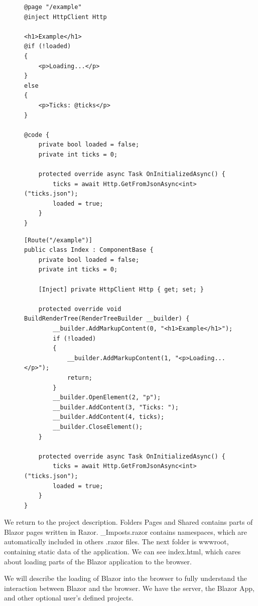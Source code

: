 \begin{figure}
\begin{minipage}[c]{0.95\textwidth}
\begin{lstlisting}[basicstyle=\small, caption=Example of Razor page., label={lst:razorpage}]
@page "/example"
@inject HttpClient Http

<h1>Example</h1>
@if (!loaded)
{
    <p>Loading...</p>
}
else
{
    <p>Ticks: @ticks</p>
}

@code {
    private bool loaded = false;
    private int ticks = 0;

    protected override async Task OnInitializedAsync() {
        ticks = await Http.GetFromJsonAsync<int>("ticks.json");
        loaded = true;
    }
}
\end{lstlisting}
\end{minipage}
\begin{minipage}[c]{0.95\textwidth}
\begin{lstlisting}[basicstyle=\small, caption=Razor page generated to the C\# class., label={lst:component}]
[Route("/example")]
public class Index : ComponentBase {
	private bool loaded = false;
	private int ticks = 0;
	
	[Inject] private HttpClient Http { get; set; }

	protected override void BuildRenderTree(RenderTreeBuilder __builder) {
		__builder.AddMarkupContent(0, "<h1>Example</h1>");
		if (!loaded)
		{
			__builder.AddMarkupContent(1, "<p>Loading...</p>");
			return;
		}
		__builder.OpenElement(2, "p");
		__builder.AddContent(3, "Ticks: ");
		__builder.AddContent(4, ticks);
		__builder.CloseElement();
	}

	protected override async Task OnInitializedAsync() {
		ticks = await Http.GetFromJsonAsync<int>("ticks.json");
		loaded = true;
	}
}
\end{lstlisting}
\end{minipage}
\end{figure}
\par
We return to the project description. 
Folders Pages and Shared contains parts of Blazor pages written in Razor.
\_Imposts.razor contains namespaces, which are automatically included in others .razor files.
The next folder is wwwroot, containing static data of the application.
We can see index.html, which cares about loading parts of the Blazor application to the browser.
\par
We will describe the loading of Blazor into the browser to fully understand the interaction between Blazor and the browser.
We have the server, the Blazor App, and other optional user's defined projects. 

